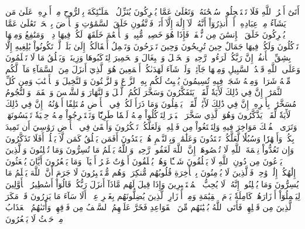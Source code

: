 أَتَىٰٓ أَمۡرُ ٱللَّهِ فَلَا تَسۡتَعۡجِلُوهُۚ سُبۡحَٰنَهُۥ وَتَعَٰلَىٰ عَمَّا يُشۡرِكُونَ
يُنَزِّلُ ٱلۡمَلَـٰٓئِكَةَ بِٱلرُّوحِ مِنۡ أَمۡرِهِۦ عَلَىٰ مَن يَشَآءُ مِنۡ عِبَادِهِۦٓ أَنۡ أَنذِرُوٓاْ أَنَّهُۥ لَآ إِلَٰهَ إِلَّآ أَنَا۠ فَٱتَّقُونِ
خَلَقَ ٱلسَّمَٰوَٰتِ وَٱلۡأَرۡضَ بِٱلۡحَقِّۚ تَعَٰلَىٰ عَمَّا يُشۡرِكُونَ
خَلَقَ ٱلۡإِنسَٰنَ مِن نُّطۡفَةٖ فَإِذَا هُوَ خَصِيمٞ مُّبِينٞ
وَٱلۡأَنۡعَٰمَ خَلَقَهَاۖ لَكُمۡ فِيهَا دِفۡءٞ وَمَنَٰفِعُ وَمِنۡهَا تَأۡكُلُونَ
وَلَكُمۡ فِيهَا جَمَالٌ حِينَ تُرِيحُونَ وَحِينَ تَسۡرَحُونَ
وَتَحۡمِلُ أَثۡقَالَكُمۡ إِلَىٰ بَلَدٖ لَّمۡ تَكُونُواْ بَٰلِغِيهِ إِلَّا بِشِقِّ ٱلۡأَنفُسِۚ إِنَّ رَبَّكُمۡ لَرَءُوفٞ رَّحِيمٞ
وَٱلۡخَيۡلَ وَٱلۡبِغَالَ وَٱلۡحَمِيرَ لِتَرۡكَبُوهَا وَزِينَةٗۚ وَيَخۡلُقُ مَا لَا تَعۡلَمُونَ
وَعَلَى ٱللَّهِ قَصۡدُ ٱلسَّبِيلِ وَمِنۡهَا جَآئِرٞۚ وَلَوۡ شَآءَ لَهَدَىٰكُمۡ أَجۡمَعِينَ
هُوَ ٱلَّذِيٓ أَنزَلَ مِنَ ٱلسَّمَآءِ مَآءٗۖ لَّكُم مِّنۡهُ شَرَابٞ وَمِنۡهُ شَجَرٞ فِيهِ تُسِيمُونَ
يُنۢبِتُ لَكُم بِهِ ٱلزَّرۡعَ وَٱلزَّيۡتُونَ وَٱلنَّخِيلَ وَٱلۡأَعۡنَٰبَ وَمِن كُلِّ ٱلثَّمَرَٰتِۚ إِنَّ فِي ذَٰلِكَ لَأٓيَةٗ لِّقَوۡمٖ يَتَفَكَّرُونَ
وَسَخَّرَ لَكُمُ ٱلَّيۡلَ وَٱلنَّهَارَ وَٱلشَّمۡسَ وَٱلۡقَمَرَۖ وَٱلنُّجُومُ مُسَخَّرَٰتُۢ بِأَمۡرِهِۦٓۚ إِنَّ فِي ذَٰلِكَ لَأٓيَٰتٖ لِّقَوۡمٖ يَعۡقِلُونَ
وَمَا ذَرَأَ لَكُمۡ فِي ٱلۡأَرۡضِ مُخۡتَلِفًا أَلۡوَٰنُهُۥٓۚ إِنَّ فِي ذَٰلِكَ لَأٓيَةٗ لِّقَوۡمٖ يَذَّكَّرُونَ
وَهُوَ ٱلَّذِي سَخَّرَ ٱلۡبَحۡرَ لِتَأۡكُلُواْ مِنۡهُ لَحۡمٗا طَرِيّٗا وَتَسۡتَخۡرِجُواْ مِنۡهُ حِلۡيَةٗ تَلۡبَسُونَهَاۖ وَتَرَى ٱلۡفُلۡكَ مَوَاخِرَ فِيهِ وَلِتَبۡتَغُواْ مِن فَضۡلِهِۦ وَلَعَلَّكُمۡ تَشۡكُرُونَ
وَأَلۡقَىٰ فِي ٱلۡأَرۡضِ رَوَٰسِيَ أَن تَمِيدَ بِكُمۡ وَأَنۡهَٰرٗا وَسُبُلٗا لَّعَلَّكُمۡ تَهۡتَدُونَ
وَعَلَٰمَٰتٖۚ وَبِٱلنَّجۡمِ هُمۡ يَهۡتَدُونَ
أَفَمَن يَخۡلُقُ كَمَن لَّا يَخۡلُقُۚ أَفَلَا تَذَكَّرُونَ
وَإِن تَعُدُّواْ نِعۡمَةَ ٱللَّهِ لَا تُحۡصُوهَآۗ إِنَّ ٱللَّهَ لَغَفُورٞ رَّحِيمٞ
وَٱللَّهُ يَعۡلَمُ مَا تُسِرُّونَ وَمَا تُعۡلِنُونَ
وَٱلَّذِينَ يَدۡعُونَ مِن دُونِ ٱللَّهِ لَا يَخۡلُقُونَ شَيۡـٔٗا وَهُمۡ يُخۡلَقُونَ
أَمۡوَٰتٌ غَيۡرُ أَحۡيَآءٖۖ وَمَا يَشۡعُرُونَ أَيَّانَ يُبۡعَثُونَ
إِلَٰهُكُمۡ إِلَٰهٞ وَٰحِدٞۚ فَٱلَّذِينَ لَا يُؤۡمِنُونَ بِٱلۡأٓخِرَةِ قُلُوبُهُم مُّنكِرَةٞ وَهُم مُّسۡتَكۡبِرُونَ
لَا جَرَمَ أَنَّ ٱللَّهَ يَعۡلَمُ مَا يُسِرُّونَ وَمَا يُعۡلِنُونَۚ إِنَّهُۥ لَا يُحِبُّ ٱلۡمُسۡتَكۡبِرِينَ
وَإِذَا قِيلَ لَهُم مَّاذَآ أَنزَلَ رَبُّكُمۡ قَالُوٓاْ أَسَٰطِيرُ ٱلۡأَوَّلِينَ
لِيَحۡمِلُوٓاْ أَوۡزَارَهُمۡ كَامِلَةٗ يَوۡمَ ٱلۡقِيَٰمَةِ وَمِنۡ أَوۡزَارِ ٱلَّذِينَ يُضِلُّونَهُم بِغَيۡرِ عِلۡمٍۗ أَلَا سَآءَ مَا يَزِرُونَ
قَدۡ مَكَرَ ٱلَّذِينَ مِن قَبۡلِهِمۡ فَأَتَى ٱللَّهُ بُنۡيَٰنَهُم مِّنَ ٱلۡقَوَاعِدِ فَخَرَّ عَلَيۡهِمُ ٱلسَّقۡفُ مِن فَوۡقِهِمۡ وَأَتَىٰهُمُ ٱلۡعَذَابُ مِنۡ حَيۡثُ لَا يَشۡعُرُونَ
